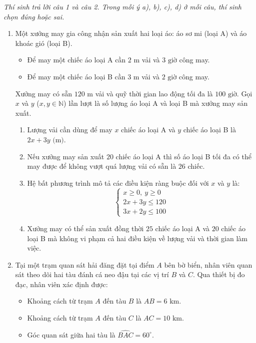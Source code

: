 \documentclass[12pt,a4paper]{article}
\newcommand{\parttitle}[1]{\par\vspace{2pt}{\large\bfseries\color{ink}#1}\par\vspace{1pt}}
\begin{document}
\parttitle{PHẦN II. Trắc nghiệm đúng/sai}
\textit{Thí sinh trả lời câu 1 và câu 2. Trong mỗi ý a), b), c), d) ở mỗi câu, thí sinh chọn đúng hoặc sai.}
\begin{enumerate}
\item Một xưởng may gia công nhận sản xuất hai loại áo: áo sơ mi (loại A) và áo khoác gió (loại B).
\begin{itemize}[leftmargin=0.6cm, itemsep=1.5pt]
    \item Để may một chiếc áo loại A cần $2\text{ m}$ vải và $3\text{ giờ}$ công may.
    \item Để may một chiếc áo loại B cần $3\text{ m}$ vải và $2\text{ giờ}$ công may.
\end{itemize}
Xưởng may có sẵn $120\text{ m}$ vải và quỹ thời gian lao động tối đa là $100\text{ giờ}$. Gọi $x$ và $y$ ($x, y \in \mathbb{N}$) lần lượt là số lượng áo loại A và loại B mà xưởng may sản xuất.
\begin{enumerate}
\item Lượng vải cần dùng để may $x$ chiếc áo loại A và $y$ chiếc áo loại B là $2x + 3y\text{ (m)}$.
\item Nếu xưởng may sản xuất $20$ chiếc áo loại A thì số áo loại B tối đa có thể may được để không vượt quá lượng vải có sẵn là $26$ chiếc.
\item Hệ bất phương trình mô tả các điều kiện ràng buộc đối với $x$ và $y$ là:
\[
\begin{cases}
x \geq 0,\ y \geq 0 \\
2x + 3y \leq 120 \\
3x + 2y \leq 100
\end{cases}
\]
\item Xưởng may có thể sản xuất đồng thời $25$ chiếc áo loại A và $20$ chiếc áo loại B mà không vi phạm cả hai điều kiện về lượng vải và thời gian làm việc.
\end{enumerate}

\item \begin{minipage}[t]{0.60\linewidth}
Tại một trạm quan sát hải đăng đặt tại điểm $A$ bên bờ biển, nhân viên quan sát theo dõi hai tàu đánh cá neo đậu tại các vị trí $B$ và $C$. Qua thiết bị đo đạc, nhân viên xác định được:
\begin{itemize}[leftmargin=0.5cm, itemsep=1.5pt]
    \item Khoảng cách từ trạm $A$ đến tàu $B$ là $AB = 6\text{ km}$.
    \item Khoảng cách từ trạm $A$ đến tàu $C$ là $AC = 10\text{ km}$.
    \item Góc quan sát giữa hai tàu là $\widehat{BAC} = 60^\circ$.
\end{itemize}
\end{minipage}\hfill
\begin{minipage}[t]{0.38\linewidth}
\vspace{-0.3\baselineskip}
\centering
{}
\end{minipage}
\end{enumerate}
\end{document}
